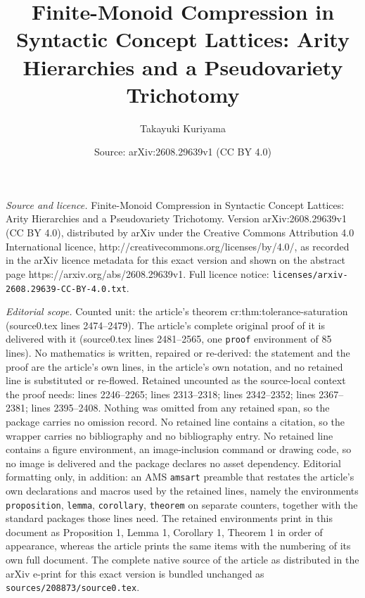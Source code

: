 \documentclass[10pt,a4paper]{amsart}
\title{Finite-Monoid Compression in Syntactic Concept Lattices: Arity Hierarchies and a Pseudovariety Trichotomy}
\author{Takayuki Kuriyama}
\date{Source: arXiv:2608.29639v1 (CC BY 4.0)}
\begin{document}
\maketitle

\noindent\emph{Source and licence.} Finite-Monoid Compression in Syntactic Concept Lattices: Arity Hierarchies and a Pseudovariety Trichotomy. Version arXiv:2608.29639v1 (CC BY 4.0), distributed by arXiv under the Creative Commons Attribution 4.0 International licence, http://creativecommons.org/licenses/by/4.0/, as recorded in the arXiv licence metadata for this exact version and shown on the abstract page https://arxiv.org/abs/2608.29639v1. Full licence notice: \texttt{licenses/arxiv-2608.29639-CC-BY-4.0.txt}.\par\smallskip

\noindent\textit{Editorial scope.} Counted unit: the article's theorem cr:thm:tolerance-saturation (source0.tex lines 2474--2479). The article's complete original proof of it is delivered with it (source0.tex lines 2481--2565, one \texttt{proof} environment of 85 lines). No mathematics is written, repaired or re-derived: the statement and the proof are the article's own lines, in the article's own notation, and no retained line is substituted or re-flowed.  Retained uncounted as the source-local context the proof needs: lines 2246--2265; lines 2313--2318; lines 2342--2352; lines 2367--2381; lines 2395--2408.  Nothing was omitted from any retained span, so the package carries no omission record.  No retained line contains a citation, so the wrapper carries no bibliography and no bibliography entry.  No retained line contains a figure environment, an image-inclusion command or drawing code, so no image is delivered and the package declares no asset dependency.  Editorial formatting only, in addition: an AMS \texttt{amsart} preamble that restates the article's own declarations and macros used by the retained lines, namely the environments \texttt{proposition}, \texttt{lemma}, \texttt{corollary}, \texttt{theorem} on separate counters, together with the standard packages those lines need.  The retained environments print in this document as Proposition 1, Lemma 1, Corollary 1, Theorem 1 in order of appearance, whereas the article prints the same items with the numbering of its own full document.  The complete native source of the article as distributed in the arXiv e-print for this exact version is bundled unchanged as \texttt{sources/208873/source0.tex}.
\end{document}
